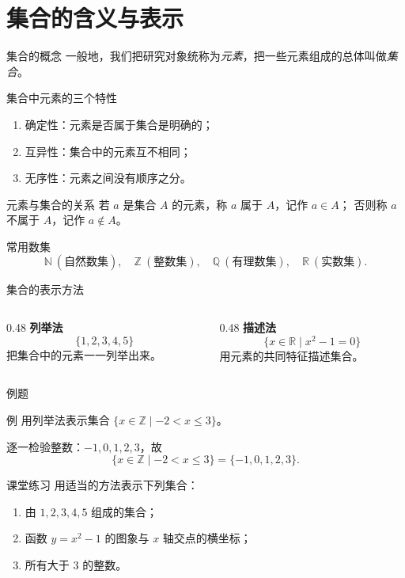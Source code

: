 \section{集合的含义与表示}

\begin{frame}{集合的概念}
  一般地，我们把研究对象统称为\emph{元素}，把一些元素组成的总体叫做\emph{集合}。

  \begin{block}{集合中元素的三个特性}
    \begin{enumerate}
      \item 确定性：元素是否属于集合是明确的；
      \item 互异性：集合中的元素互不相同；
      \item 无序性：元素之间没有顺序之分。
    \end{enumerate}
  \end{block}
\end{frame}

\begin{frame}{元素与集合的关系}
  若 $a$ 是集合 $A$ 的元素，称 $a$ \alert{属于} $A$，记作 $a\in A$；
  否则称 $a$ \alert{不属于} $A$，记作 $a\notin A$。

  \vspace{1em}
  \begin{exampleblock}{常用数集}
    \[
      \mathbb{N}\ (\text{自然数集}),\quad
      \mathbb{Z}\ (\text{整数集}),\quad
      \mathbb{Q}\ (\text{有理数集}),\quad
      \mathbb{R}\ (\text{实数集}).
    \]
  \end{exampleblock}
\end{frame}

\begin{frame}{集合的表示方法}
  \begin{columns}[T]
    \begin{column}{0.48\textwidth}
      \textbf{列举法}
      \[
        \{1,2,3,4,5\}
      \]
      把集合中的元素一一列举出来。
    \end{column}
    \begin{column}{0.48\textwidth}
      \textbf{描述法}
      \[
        \{x\in\mathbb{R}\mid x^2-1=0\}
      \]
      用元素的共同特征描述集合。
    \end{column}
  \end{columns}
\end{frame}

\begin{frame}{例题}
  \begin{block}{例}
    用列举法表示集合 $\{x\in\mathbb{Z}\mid -2<x\le 3\}$。
  \end{block}
  \pause
  逐一检验整数：$-1,0,1,2,3$，故
  \[
    \{x\in\mathbb{Z}\mid -2<x\le 3\}=\{-1,0,1,2,3\}.
  \]
\end{frame}

\begin{frame}{课堂练习}
  用适当的方法表示下列集合：
  \begin{enumerate}
    \item 由 $1,2,3,4,5$ 组成的集合；
    \item 函数 $y=x^2-1$ 的图象与 $x$ 轴交点的横坐标；
    \item 所有大于 $3$ 的整数。
  \end{enumerate}
\end{frame}
